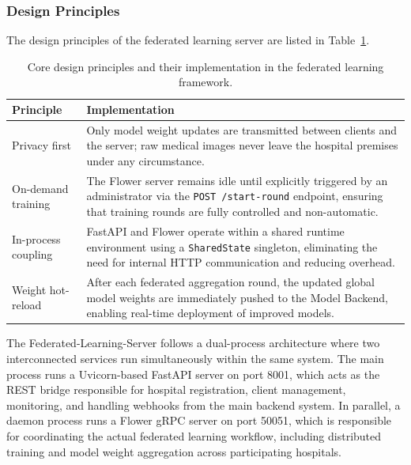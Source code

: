 \subsubsection{Design Principles}
The design principles of the federated learning server are listed in Table~\ref{tab:fl_principles}.
\begin{table}[htbp]
	\centering
	\caption{Core design principles and their implementation in the federated learning framework.}
	\label{tab:fl_principles}
	\begin{tabular}{|p{4cm}|p{9cm}|}
		\hline
		\textbf{Principle} & \textbf{Implementation} \\
		\hline
		
		Privacy first &
		Only model weight updates are transmitted between clients and the server; raw medical images never leave the hospital premises under any circumstance. \\
		\hline
		
		On-demand training &
		The Flower server remains idle until explicitly triggered by an administrator via the \texttt{POST /start-round} endpoint, ensuring that training rounds are fully controlled and non-automatic. \\
		\hline
		
		In-process coupling &
		FastAPI and Flower operate within a shared runtime environment using a \texttt{SharedState} singleton, eliminating the need for internal HTTP communication and reducing overhead. \\
		\hline
		
		Weight hot-reload &
		After each federated aggregation round, the updated global model weights are immediately pushed to the Model Backend, enabling real-time deployment of improved models. \\
		\hline
		
	\end{tabular}
\end{table}

The Federated-Learning-Server follows a dual-process architecture where two interconnected services run simultaneously within the same system. The main process runs a Uvicorn-based FastAPI server on port 8001, which acts as the REST bridge responsible for hospital registration, client management, monitoring, and handling webhooks from the main backend system. In parallel, a daemon process runs a Flower gRPC server on port 50051, which is responsible for coordinating the actual federated learning workflow, including distributed training and model weight aggregation across participating hospitals.

